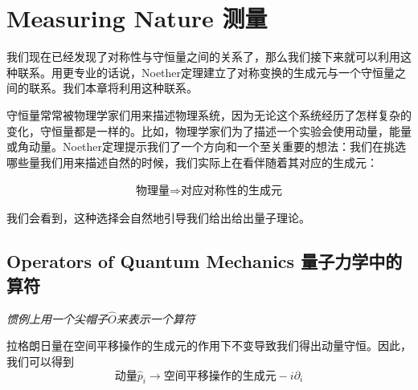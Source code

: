 


\chapter[测量]{Measuring Nature 测量}\label{chap5}

我们现在已经发现了对称性与守恒量之间的关系了，那么我们接下来就可以利用这种联系。用更专业的话说，Noether定理建立了对称变换的生成元与一个守恒量之间的联系。我们本章将利用这种联系。

守恒量常常被物理学家们用来描述物理系统，因为无论这个系统经历了怎样复杂的变化，守恒量都是一样的。比如，物理学家们为了描述一个实验会使用动量，能量或角动量。Noether定理提示我们了一个方向和一个至关重要的想法：我们在挑选哪些量我们用来描述自然的时候，我们实际上在看伴随着其对应的生成元：

\begin{align}
\text{物理量}\Rightarrow\text{对应对称性的生成元}
\end{align}

我们会看到，这种选择会自然地引导我们给出给出量子理论。

\section[量子力学中的算符]{Operators of Quantum Mechanics 量子力学中的算符}\label{sec5.1}

{\it 惯例上用一个尖帽子$\hat{O}$来表示一个算符}

拉格朗日量在空间平移操作的生成元的作用下不变导致我们得出动量守恒。因此，我们可以得到
\[\text{动量}\hat{p}_i\to\text{空间平移操作的生成元} - i\partial_i \]





